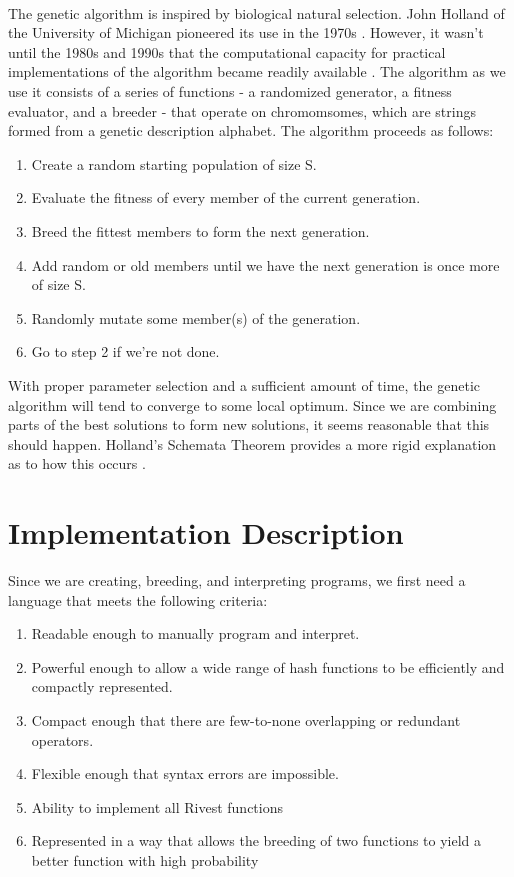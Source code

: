 \documentclass{article}
\begin{document}
\paragraph{}
The genetic algorithm is inspired by biological natural selection. John Holland of the University of Michigan pioneered its use in the 1970s \cite{Holland1973}.
However, it wasn't until the 1980s and 1990s that the computational capacity for practical implementations of the algorithm became readily available \cite{Goldberg}. The algorithm as we use it consists of a series of functions - a randomized generator, a fitness evaluator, and a breeder - that operate on chromomsomes, which are strings formed from a genetic description alphabet. The algorithm proceeds as follows:
\begin{enumerate}
	\item Create a random starting population of size S.
	\item Evaluate the fitness of every member of the current generation.
	\item Breed the fittest members to form the next generation.
	\item Add random or old members until we have the next generation is once more of size S.
	\item Randomly mutate some member(s) of the generation.
	\item Go to step 2 if we're not done.
\end{enumerate}

With proper parameter selection and a sufficient amount of time, the genetic algorithm will tend to converge to some local optimum. Since we are combining parts of the best solutions to form new solutions, it seems reasonable that this should happen. Holland's Schemata Theorem provides a more rigid explanation as to how this occurs \cite{citeulike:1281572}.

\section{Implementation Description}
Since we are creating, breeding, and interpreting programs, we first need a language that meets the following criteria:

\begin{enumerate}
\item Readable enough to manually program and interpret.
\item Powerful enough to allow a wide range of hash functions to be efficiently and compactly represented.
\item Compact enough that there are few-to-none overlapping or redundant operators.
\item Flexible enough that syntax errors are impossible.
\item Ability to implement all Rivest functions
\item Represented in a way that allows the breeding of two functions to yield a better function with high probability
\end{enumerate}
\end{document}
